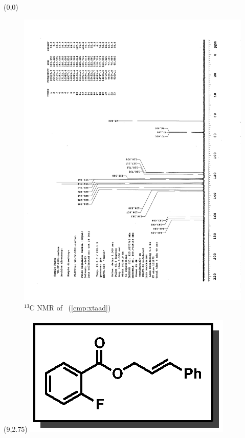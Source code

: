\clearpage
\begin{textblock}{20}(0,0)
\begin{figure}[htb]
\caption{$^{13}$C NMR of  \CMPxtaad\ (\ref{cmp:xtaad})}
\includegraphics[scale=0.75, trim = 0mm 0mm 0mm 5mm,
clip]{chp_asymmetric/images/nmr/xtaadC}
\vspace{-100pt}
\end{figure}
\end{textblock}
\begin{textblock}{1}(9,2.75)
\includegraphics[scale=0.8, angle=90]{chp_asymmetric/images/xtaad}
\end{textblock}
